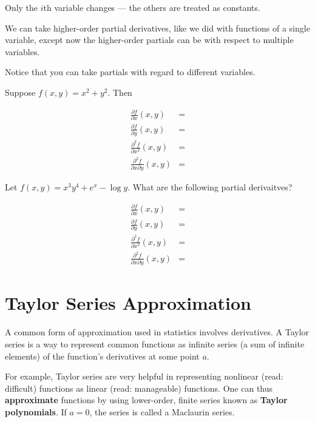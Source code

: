 \documentclass[]{book}
\theoremstyle{definition}
\theoremstyle{definition}
\theoremstyle{definition}
\theoremstyle{remark}
\let\BeginKnitrBlock\begin \let\EndKnitrBlock\end
\begin{document}
Only the \(i\)th variable changes --- the others are treated as
constants.

We can take higher-order partial derivatives, like we did with functions
of a single variable, except now the higher-order partials can be with
respect to multiple variables.

\BeginKnitrBlock{example}[More than one type of partial]
\protect\hypertarget{exm:unnamed-chunk-18}{}{\label{exm:unnamed-chunk-18}
{} }Notice that you can take
partials with regard to different variables.

Suppose \(f(x,y)=x^2+y^2\). Then

\begin{align*}
\frac{\partial f}{\partial x}(x,y) &=\\
\frac{\partial f}{\partial y}(x,y) &=\\
\frac{\partial^2 f}{\partial x^2}(x,y) &=\\
\frac{\partial^2 f}{\partial x \partial y}(x,y) &=
\end{align*}
\EndKnitrBlock{example}

\BeginKnitrBlock{exercise}
\protect\hypertarget{exr:unnamed-chunk-19}{}{\label{exr:unnamed-chunk-19}
}Let \(f(x,y)=x^3 y^4 +e^x -\log y\). What are the following partial
derivaitves?

\begin{align*}
\frac{\partial f}{\partial x}(x,y) &=\\
\frac{\partial f}{\partial y}(x,y) &=\\
\frac{\partial^2 f}{\partial x^2}(x,y) &=\\
\frac{\partial^2 f}{\partial x \partial y}(x,y) &= 
\end{align*}
\EndKnitrBlock{exercise}

\section{Taylor Series Approximation}\label{taylorapprox}

A common form of approximation used in statistics involves derivatives.
A Taylor series is a way to represent common functions as infinite
series (a sum of infinite elements) of the function's derivatives at
some point \(a\).

For example, Taylor series are very helpful in representing nonlinear
(read: difficult) functions as linear (read: manageable) functions. One
can thus \textbf{approximate} functions by using lower-order, finite
series known as \textbf{Taylor polynomials}. If \(a=0\), the series is
called a Maclaurin series.
\end{document}
